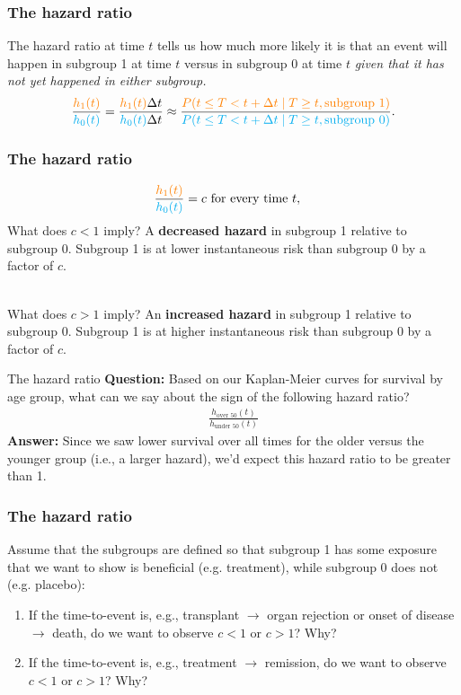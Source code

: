 \documentclass[10pt,t]{beamer}
\begin{document}
\begin{frame}
\frametitle{The hazard ratio}
The hazard ratio at time $t$ tells us how much more likely it is that an event will happen in subgroup 1 at time $t$ versus in subgroup 0 at time $t$ \textit{given that it has not yet happened in either subgroup.}
\begin{align*}
\frac{\textcolor{orange}{h_1(t)}}{\textcolor{cyan}{h_0(t)}} = \frac{\textcolor{orange}{h_1(t)}\Delta t}{\textcolor{cyan}{h_0(t)}\Delta t} \approx \frac{\textcolor{orange}{P(t \leq T < t + \Delta t \mid T \geq t, \text{subgroup }1)}}{\textcolor{cyan}{P(t \leq T < t + \Delta t \mid T \geq t, \text{subgroup }0)}}.
\end{align*}

\end{frame}

\begin{frame}
\frametitle{The hazard ratio}
\begin{align*}
	\frac{\textcolor{orange}{h_1(t)}}{\textcolor{cyan}{h_0(t)}} &= c \text{ for every time } t,
\end{align*}
What does $c < 1$ imply? \pause A \textbf{decreased hazard} in subgroup 1 relative to subgroup 0. Subgroup 1 is at lower instantaneous risk than subgroup 0 by a factor of $c$.\pause 
\\ ~\ 

What does $c > 1$ imply? \pause An \textbf{increased hazard} in subgroup 1 relative to subgroup 0.  Subgroup 1 is at higher instantaneous risk than subgroup 0 by a factor of $c$.
\end{frame}

\begin{frame}{The hazard ratio}
	\textbf{Question:} Based on our Kaplan-Meier curves for survival by age group, what can we say about the sign of the following hazard ratio?
	\begin{align*}
		\frac{h_{\text{over 50}}(t)}{h_{\text{under 50}}(t)}
	\end{align*} \pause 
	\textbf{Answer:} Since we saw lower survival over all times for the older versus the younger group (i.e., a larger hazard), we'd expect this hazard ratio to be greater than 1.
\end{frame}

\begin{frame}
\frametitle{The hazard ratio}
Assume that the subgroups are defined so that subgroup 1 has some exposure that we want to show is beneficial (e.g. treatment), while subgroup 0 does not (e.g. placebo):

\begin{enumerate}
\item If the time-to-event is, e.g., transplant $\rightarrow$ organ rejection or onset of disease $\rightarrow$ death, do we want to observe $c < 1$ or $c > 1$? Why?
\item If the time-to-event is, e.g., treatment $\rightarrow$ remission, do we want to observe $c < 1$ or $c > 1$? Why?
\end{enumerate}
\end{frame}
\end{document}

